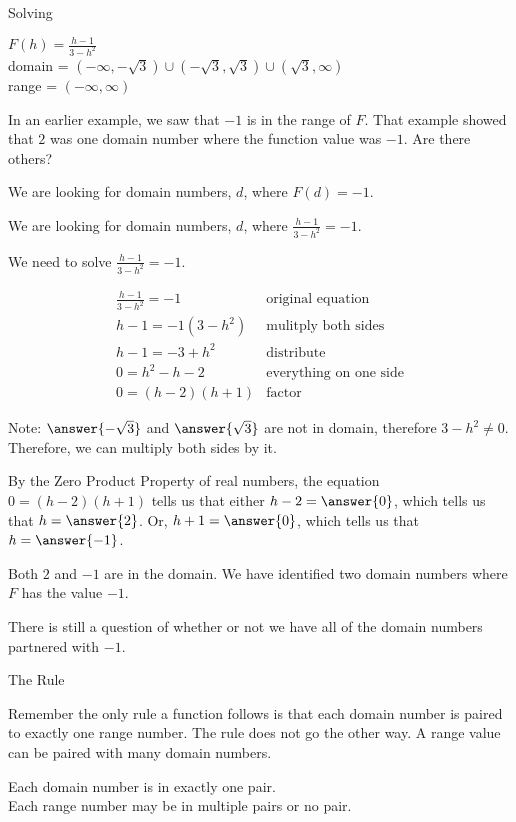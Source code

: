 \documentclass{ximera}
\begin{document}
\begin{example}   Solving 

$F(h) = \frac{h-1}{3-h^2}$ \\
domain = $(-\infty, -\sqrt{3}) \cup (-\sqrt{3}, \sqrt{3}) \cup (\sqrt{3}, \infty)$ \\
range = $(-\infty, \infty)$


In an earlier example, we saw that $-1$ is in the range of $F$.  That example showed that $2$ was one domain number where the function value was $-1$. Are there others?


We are looking for domain numbers, $d$, where $F(d) = -1$.  

We are looking for domain numbers, $d$, where $\frac{h-1}{3-h^2} = -1$.  

We need to solve $\frac{h-1}{3-h^2} = -1$.



\[
\begin{array}{ll}
\frac{h-1}{3-h^2} = -1 &  \text{original equation} \\
h - 1 = -1 (3-h^2)    &  \text{mulitply both sides} \\
h - 1 = -3 + h^2    &      \text{distribute} \\
0 = h^2 - h - 2    &      \text{everything on one side} \\
0 =(h-2)(h+1)    &   \text{factor}   
\end{array}
\]


Note:  $\answer{-\sqrt{3}}$ and $\answer{\sqrt{3}}$ are not in domain, therefore $3 - h^2 \ne 0$. Therefore, we can multiply both sides by it.  

By the Zero Product Property of real numbers, the equation $0 =(h-2)(h+1)$ tells us that either $h-2 = \answer{0}$, which tells us that $h = \answer{2}$. Or, $h+1 = \answer{0}$, which tells us that $h = \answer{-1}$.

Both $2$ and $-1$ are in the domain.  We have identified two domain numbers where $F$ has the value $-1$.



\end{example}
There is still a question of whether or not we have all of the domain numbers partnered with $-1$. \\


\begin{remark}  The Rule

Remember the only rule a function follows is that each domain number is paired to exactly one range number.  The rule does not go the other way.  A range value can be paired with many domain numbers.

Each domain number is in exactly one pair. \\
Each range number may be in multiple pairs or no pair.


\end{remark}
\end{document}
